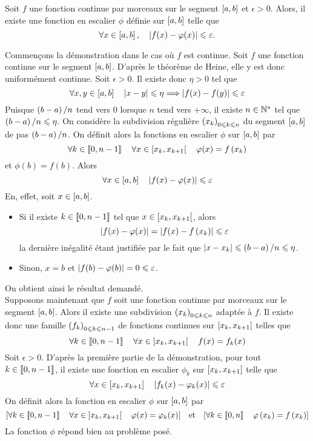 \documentclass{magnolia}
\begin{document}
\begin{proposition}[utile=3]
  Soit $f$ une fonction continue par morceaux sur le segment $\left[a,b\right]$
  et $\epsilon>0$. Alors, il existe une fonction en escalier $\phi$ définie sur
  $\left[a,b\right]$ telle que
  \[\forall x\in\left[a,b\right] ,\quad \left|f(x)-\varphi(x)\right|\leqslant\varepsilon.\]
  \end{proposition}
  \begin{preuve}
  Commençons la démonstration dans le cas où $f$ est continue. Soit $f$ une
  fonction continue sur le segment $\left[a,b\right]$. D'après le théorème de Heine,
  elle y est donc uniformément continue. Soit $\epsilon>0$. Il existe donc
  $\eta>0$ tel que
  \[\forall x,y\in\left[a,b\right] \quad \left|x-y\right|\leqslant\eta \Longrightarrow
    \left|f(x)-f(y)\right|\leqslant\varepsilon\]
  Puisque $\left(b-a\right)/n$ tend vers 0 lorsque $n$ tend vers $+\infty$, il existe
  $n\in{\mathbb{N}^*}$ tel que $\left(b-a\right)/n\leqslant\eta$. On considère la subdivision régulière
  $\left(x_k\right)_{0\leqslant k\leqslant n}$ du segment $\left[a,b\right]$ de pas $\left(b-a\right)/n$. On
  définit alors la fonctions en escalier $\phi$ sur $\left[a,b\right]$ par
  \[\forall k\in\left\llbracket 0,n-1\right\rrbracket \quad \forall x\in\left[x_k,x_{k+1}\right[ \quad
    \varphi(x)=f\left(x_k\right)\]
  et $\phi(b)=f(b)$. Alors
  \[\forall x\in\left[a,b\right] \quad \left|f(x)-\varphi(x)\right|\leqslant\varepsilon\]
  En, effet, soit $x\in\left[a,b\right]$.
  \begin{itemize}
  \item Si il existe $k\in\left\llbracket 0,n-1\right\rrbracket$ tel que $x\in\left[x_k,x_{k+1}\right[$,
    alors
    \[\left|f(x)-\varphi(x)\right|=\left|f(x)-f\left(x_k\right)\right|\leqslant\varepsilon\]
    la dernière inégalité étant justifiée par le fait que
    $\left|x-x_k\right|\leqslant\left(b-a\right)/n\leqslant\eta$.
  \item Sinon, $x=b$ et $\left|f(b)-\varphi(b)\right|=0\leqslant\varepsilon$.
  \end{itemize}
  On obtient ainsi le résultat demandé.\\
  Supposons maintenant que $f$ soit une fonction continue par morceaux sur le
  segment $\left[a,b\right]$. Alors il existe une subdivision
  $\left(x_k\right)_{0\leqslant k\leqslant n}$ adaptée à $f$. Il existe donc une famille
  $\left(f_k\right)_{0\leqslant k\leqslant n-1}$ de fonctions continues sur $\left[x_k,x_{k+1}\right]$
  telles que
  \[\forall k\in\left\llbracket 0,n-1\right\rrbracket \quad \forall x\in\left]x_k,x_{k+1}\right[ \quad
    f(x)=f_k(x)\]
  Soit $\epsilon>0$.
  D'après la première partie de la démonstration, pour tout $k\in\left\llbracket 0,n-1\right\rrbracket$,
  il existe une fonction en escalier $\phi_k$ sur $\left[x_k,x_{k+1}\right]$
  telle que
  \[\forall x\in\left[x_k,x_{k+1}\right] \quad \left|f_k(x)-\varphi_k(x)\right|
    \leqslant\varepsilon\]
  On définit alors la fonction en escalier $\phi$ sur $\left[a,b\right]$ par
  \[\left[\forall k\in\left\llbracket 0,n-1\right\rrbracket \quad \forall x\in\left]x_k,x_{k+1}\right[ \quad
    \varphi(x)=\varphi_k(x)\right] \quad\!\text{et}\quad\! 
    \left[\forall k\in\left\llbracket 0,n\right\rrbracket \quad \varphi\left(x_k\right)=f\left(x_k\right)\right]\]
  La fonction $\phi$ répond bien au problème posé.
  \end{preuve}
\end{document}
